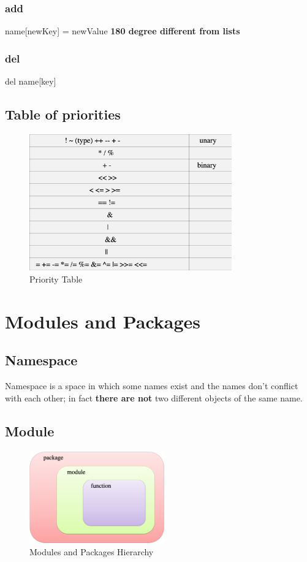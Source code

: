 \documentclass[11pt]{article}
\begin{document}
\subsubsection{add}
\label{sec:org412e0c6}
name[newKey] = newValue
\textbf{180 degree different from lists}

\subsubsection{del}
\label{sec:org1012a93}
del name[key]


\newpage
\subsection{Table of priorities}
\label{sec:org47e8966}

\begin{figure}[htbp]
\centering
\includegraphics[width=330px]{./images/priorities.png}
\caption{Priority Table}
\end{figure}

\newpage
\section{Modules and Packages}
\label{sec:org13566d4}
\subsection{Namespace}
\label{sec:orgfceb4e0}
Namespace is a space in which some names exist and the names don’t
conflict with each other; in fact \textbf{there are not} two different objects of the
same name.
\subsection{Module}
\label{sec:org8a6a4f6}

\begin{figure}[htbp]
\centering
\includegraphics[width=220px]{./images/moduleHierarchy.png}
\caption{Modules and Packages Hierarchy}
\end{figure}
\end{document}

